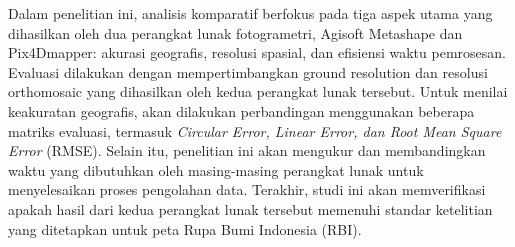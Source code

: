 \par Dalam penelitian ini, analisis komparatif berfokus pada tiga aspek utama yang dihasilkan oleh dua perangkat lunak fotogrametri, Agisoft Metashape dan Pix4Dmapper: akurasi geografis, resolusi spasial, dan efisiensi waktu pemrosesan. Evaluasi dilakukan dengan mempertimbangkan ground resolution dan resolusi orthomosaic yang dihasilkan oleh kedua perangkat lunak tersebut. Untuk menilai keakuratan geografis, akan dilakukan perbandingan menggunakan beberapa matriks evaluasi, termasuk \textit{Circular Error, Linear Error, dan Root Mean Square Error} (RMSE). Selain itu, penelitian ini akan mengukur dan membandingkan waktu yang dibutuhkan oleh masing-masing perangkat lunak untuk menyelesaikan proses pengolahan data. Terakhir, studi ini akan memverifikasi apakah hasil dari kedua perangkat lunak tersebut memenuhi standar ketelitian yang ditetapkan untuk peta Rupa Bumi Indonesia (RBI).

